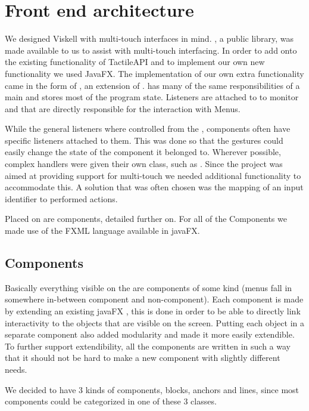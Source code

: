 \section{Front end architecture}
We designed Viskell with multi-touch interfaces in mind. , a public library, was made available to us to assist with multi-touch interfacing. In order to add onto the existing functionality of TactileAPI and to implement our own new functionality we used JavaFX.
The implementation of our own extra functionality came in the form of , an extension of .
 has many of the same responsibilities of a main  and stores most of the program state.
Listeners are attached to  to monitor  and  that are directly responsible for the interaction with Menus.

While the general listeners where controlled from the , components often have specific listeners attached to them.
This was done so that the gestures could easily change the state of the component it belonged to. Wherever possible, complex handlers were given their own class, such as . Since the project was aimed at providing support for multi-touch we needed additional functionality to accommodate this. A solution that was often chosen was the mapping of an input identifier to performed actions.

Placed on  are components, detailed further on. For all of the Components we made use of the FXML language available in javaFX.

\subsection{Components}
Basically everything visible on the  are components of some kind (menus fall in somewhere in-between component and non-component).
Each component is made by extending an existing javaFX , this is done in order to be able to directly link interactivity to the objects that are visible on the screen.
Putting each object in a separate component also added modularity and made it more easily extendible.
To further support extendibility, all the components are written in such a way that it should not be hard to make a new component with slightly different needs.

We decided to have 3 kinds of components, blocks, anchors and lines, since most components could be categorized in one of these 3 classes.

